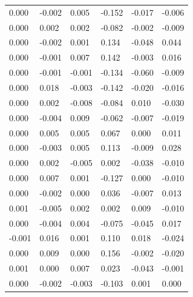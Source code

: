 \begin{longtable}{llllll}
0.000        & -0.002             & 0.005             & -0.152      & -0.017      & -0.006       \\
0.000        & 0.002              & 0.002             & -0.082      & -0.002      & -0.009       \\
0.000        & -0.002             & 0.001             & 0.134       & -0.048      & 0.044        \\
0.000        & -0.001             & 0.007             & 0.142       & -0.003      & 0.016        \\
0.000        & -0.001             & -0.001            & -0.134      & -0.060      & -0.009       \\
0.000        & 0.018              & -0.003            & -0.142      & -0.020      & -0.016       \\
0.000        & 0.002              & -0.008            & -0.084      & 0.010       & -0.030       \\
0.000        & -0.004             & 0.009             & -0.062      & -0.007      & -0.019       \\
0.000        & 0.005              & 0.005             & 0.067       & 0.000       & 0.011        \\
0.000        & -0.003             & 0.005             & 0.113       & -0.009      & 0.028        \\
0.000        & 0.002              & -0.005            & 0.002       & -0.038      & -0.010       \\
0.000        & 0.007              & 0.001             & -0.127      & 0.000       & -0.010       \\
0.000        & -0.002             & 0.000             & 0.036       & -0.007      & 0.013        \\
0.001        & -0.005             & 0.002             & 0.002       & 0.009       & -0.010       \\
0.000        & -0.004             & 0.004             & -0.075      & -0.045      & 0.017        \\
-0.001       & 0.016              & 0.001             & 0.110       & 0.018       & -0.024       \\
0.000        & 0.009              & 0.000             & 0.156       & -0.002      & -0.020       \\
0.001        & 0.000              & 0.007             & 0.023       & -0.043      & -0.001       \\
0.000        & -0.002             & -0.003            & -0.103      & 0.001       & 0.000        \\

\end{longtable}
